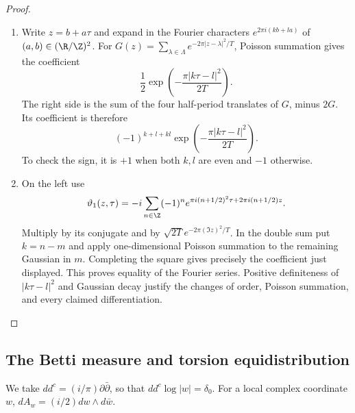 \begin{proof}
\begin{enumerate}[label=\arabic*.,leftmargin=*]
\item Write $z=b+a\tau$ and expand in the Fourier characters
$e^{2\pi i(kb+la)}$ of $(a,b)\in(\R/\Z)^2$.
For $G(z)=\sum_{\lambda\in\Lambda}e^{-2\pi|z-\lambda|^2/T}$,
Poisson summation gives the coefficient
\[
 \frac12\exp\left(-\frac{\pi|k\tau-l|^2}{2T}\right).
\]
The right side is the sum of the four half-period translates
of $G$, minus $2G$. Its coefficient is therefore
\[
 (-1)^{k+l+kl}
       \exp\left(-\frac{\pi|k\tau-l|^2}{2T}\right).
\]
To check the sign, it is $+1$ when both $k,l$ are even and
$-1$ otherwise.

\item On the left use
\[
 \vartheta_1(z,\tau)
 =-i\sum_{n\in\Z}(-1)^n
        e^{\pi i(n+1/2)^2\tau+2\pi i(n+1/2)z}.
\]
Multiply by its conjugate and by
$\sqrt{2T}e^{-2\pi(\Im z)^2/T}$.
In the double sum put $k=n-m$ and apply one-dimensional
Poisson summation to the remaining Gaussian in $m$.
Completing the square gives precisely the coefficient just
displayed. This proves equality of the Fourier series.
Positive definiteness of $|k\tau-l|^2$ and Gaussian decay
justify the changes of order, Poisson summation, and every
claimed differentiation.
\end{enumerate}
\end{proof}




\subsection{The Betti measure and torsion equidistribution}

We take $dd^c=(i/\pi)\partial\bar\partial$, so that
$dd^c\log|w|=\delta_0$. For a local complex coordinate $w$,
$dA_w=(i/2)dw\wedge d\bar w$.

